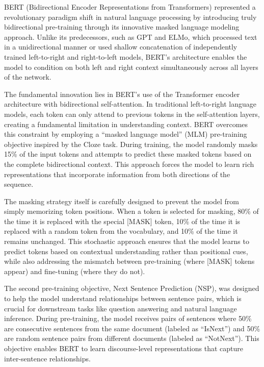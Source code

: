 \documentclass[
  titlepage]{article}
\begin{document}
BERT (Bidirectional Encoder Representations from Transformers)
represented a revolutionary paradigm shift in natural language
processing by introducing truly bidirectional pre-training through its
innovative masked language modeling approach. Unlike its predecessors,
such as GPT and ELMo, which processed text in a unidirectional manner or
used shallow concatenation of independently trained left-to-right and
right-to-left models, BERT's architecture enables the model to condition
on both left and right context simultaneously across all layers of the
network.

The fundamental innovation lies in BERT's use of the Transformer encoder
architecture with bidirectional self-attention. In traditional
left-to-right language models, each token can only attend to previous
tokens in the self-attention layers, creating a fundamental limitation
in understanding context. BERT overcomes this constraint by employing a
``masked language model'' (MLM) pre-training objective inspired by the
Cloze task. During training, the model randomly masks 15\% of the input
tokens and attempts to predict these masked tokens based on the complete
bidirectional context. This approach forces the model to learn rich
representations that incorporate information from both directions of the
sequence.

The masking strategy itself is carefully designed to prevent the model
from simply memorizing token positions. When a token is selected for
masking, 80\% of the time it is replaced with the special {[}MASK{]}
token, 10\% of the time it is replaced with a random token from the
vocabulary, and 10\% of the time it remains unchanged. This stochastic
approach ensures that the model learns to predict tokens based on
contextual understanding rather than positional cues, while also
addressing the mismatch between pre-training (where {[}MASK{]} tokens
appear) and fine-tuning (where they do not).

The second pre-training objective, Next Sentence Prediction (NSP), was
designed to help the model understand relationships between sentence
pairs, which is crucial for downstream tasks like question answering and
natural language inference. During pre-training, the model receives
pairs of sentences where 50\% are consecutive sentences from the same
document (labeled as ``IsNext'') and 50\% are random sentence pairs from
different documents (labeled as ``NotNext''). This objective enables
BERT to learn discourse-level representations that capture
inter-sentence relationships.
\end{document}
